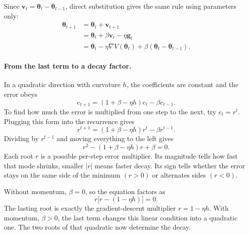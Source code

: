 \documentclass[11pt,letterpaper]{article}
\newcommand{\thet}{\bm{\theta}}
\begin{document}
Since \(\bm v_t=\thet_t-\thet_{t-1}\), direct substitution gives the same rule
using parameters only:
\begin{equation}\label{eq:momentum_update}
  \begin{aligned}
    \thet_{t+1}
      &=\thet_t+\bm v_{t+1}\\
      &=\thet_t+\beta\bm v_t-\eta\bm g_t\\
      &=\thet_t-\eta\nabla V(\thet_t)
        +\beta(\thet_t-\thet_{t-1}).
  \end{aligned}
\end{equation}

\paragraph{From the last term to a decay factor.}
In a quadratic direction with curvature \(h\), the coefficients are constant
and the error obeys
\begin{equation}\label{eq:momentum_error}
  e_{t+1}=(1+\beta-\eta h)e_t-\beta e_{t-1}.
\end{equation}
To find how much the error is multiplied from one step to the next, try
\(e_t=r^t\). Plugging this form into the recurrence gives
\begin{equation}
  r^{t+1}
  =(1+\beta-\eta h)r^t-\beta r^{t-1}.
\end{equation}
Dividing by \(r^{t-1}\) and moving everything to the left gives
\begin{equation}\label{eq:momentum_characteristic}
  r^2-(1+\beta-\eta h)r+\beta=0.
\end{equation}
Each root \(r\) is a possible per-step error multiplier. Its magnitude tells
how fast that mode shrinks, smaller \(\lvert r\rvert\) means faster decay. Its
sign tells whether the error stays on the same side of the minimum
\((r>0)\) or alternates sides \((r<0)\).

Without momentum, \(\beta=0\), so the equation factors as
\begin{equation}
  r\bigl[r-(1-\eta h)\bigr]=0.
\end{equation}
The lasting root is exactly the gradient-descent multiplier
\(r=1-\eta h\). With momentum, \(\beta>0\), the last term changes this linear
condition into a quadratic one. The two roots of that quadratic now determine
the decay.
\end{document}
